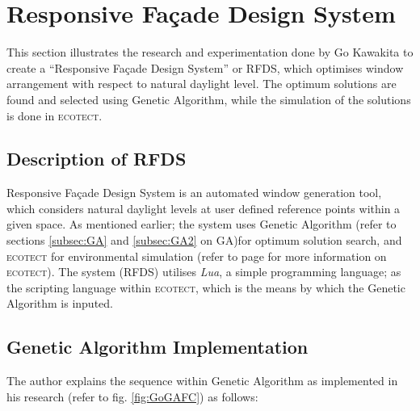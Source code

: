 \clearpage

\section{Responsive Fa\c{c}ade Design System}

This section illustrates the research and experimentation done by Go Kawakita \cite{kawakita08} to create a ``Responsive Fa\c{c}ade Design System'' or RFDS, which optimises window arrangement with respect to natural daylight level. The optimum solutions are found and selected using Genetic Algorithm, while the simulation of the solutions is done in \textsc{ecotect}.

\subsection{Description of RFDS}

Responsive Fa\c{c}ade Design System is an automated window generation tool, which considers natural daylight levels at user defined reference points within a given space. As mentioned earlier; the system uses Genetic Algorithm (refer to sections \ref{subsec:GA} and \ref{subsec:GA2} on GA)for optimum solution search, and \textsc{ecotect} for environmental simulation (refer to page \pageref{par:ECOTECT} for more information on \textsc{ecotect}). The system (RFDS) utilises \emph{Lua}, a simple programming language; as the scripting language within \textsc{ecotect}, which is the means by which the Genetic Algorithm is inputed.

\subsection{Genetic Algorithm Implementation}

The author explains the sequence within Genetic Algorithm as implemented in his research (refer to fig. \ref{fig:GoGAFC}) as follows:

